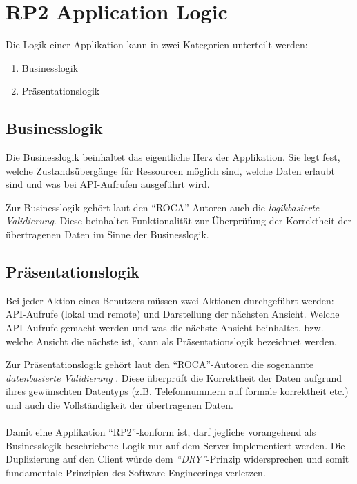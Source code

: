 \section{RP2 Application Logic}
\label{sec:principle-rp2-application-logic}


Die Logik einer Applikation kann in zwei Kategorien unterteilt werden:
\begin{enumerate}
	\item Businesslogik
	\item Präsentationslogik
\end{enumerate}

\subsection*{Businesslogik}
Die Businesslogik beinhaltet das eigentliche Herz der Applikation. Sie legt fest, welche Zustandsübergänge für Ressourcen möglich sind, welche Daten erlaubt sind und was bei API-Aufrufen ausgeführt wird.

Zur Businesslogik gehört laut den ``ROCA''-Autoren auch die \emph{logikbasierte Validierung}. Diese beinhaltet \cite{ObjektspektrumROCA} Funktionalität zur Überprüfung der Korrektheit der übertragenen Daten im Sinne der Businesslogik.

\subsection*{Präsentationslogik}
Bei jeder Aktion eines Benutzers müssen zwei Aktionen durchgeführt werden: API-Aufrufe (lokal und remote) und Darstellung der nächsten Ansicht. Welche API-Aufrufe gemacht werden und was die nächste Ansicht beinhaltet, bzw. welche Ansicht die nächste ist, kann als Präsentationslogik bezeichnet werden.

Zur Präsentationslogik gehört laut den ``ROCA''-Autoren die sogenannte \emph{datenbasierte Validierung} \cite{ObjektspektrumROCA}. Diese überprüft die Korrektheit der Daten aufgrund ihres gewünschten Datentyps (z.B. Telefonnummern auf formale korrektheit etc.) und auch die Vollständigkeit der übertragenen Daten.
\\ \\
Damit eine Applikation ``RP2''-konform ist, darf jegliche vorangehend als Businesslogik beschriebene Logik nur auf dem Server implementiert werden. Die Duplizierung auf den Client würde dem \emph{``\gls{DRY}''}-Prinzip widersprechen und somit fundamentale Prinzipien des Software Engineerings verletzen.

